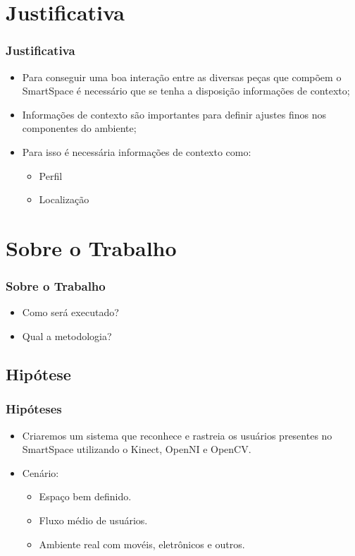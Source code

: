 \documentclass{beamer}
\begin{document}
\section{Justificativa} 
\begin{frame}
    \frametitle{Justificativa}
    \begin{itemize}
      \item Para conseguir uma boa interação entre as diversas peças que compõem o SmartSpace é necessário que se tenha a disposição informações de contexto;
      \item Informações de contexto são importantes para definir ajustes finos nos componentes do ambiente;
      \item Para isso é necessária informações de contexto como:
	    \begin{itemize}
		\item Perfil
		\item Localização
	    \end{itemize}
    \end{itemize}
\end{frame}


\section{Sobre o Trabalho}
\begin{frame}
    \frametitle{Sobre o Trabalho}
    \begin{itemize}
        \item Como será executado?
        \item Qual a metodologia?
    \end{itemize}
\end{frame}

\subsection{Hipótese}
\begin{frame}
    \frametitle{Hipóteses}
    \begin{itemize}
      \item Criaremos um sistema que reconhece e rastreia os usuários presentes no SmartSpace utilizando o Kinect, OpenNI e OpenCV.

      \item Cenário:
        \begin{itemize}
            \item Espaço bem definido.
            \item Fluxo médio de usuários.
            \item Ambiente real com movéis, eletrônicos e outros.
        \end{itemize} 
    \end{itemize}
\end{frame}
\end{document}
